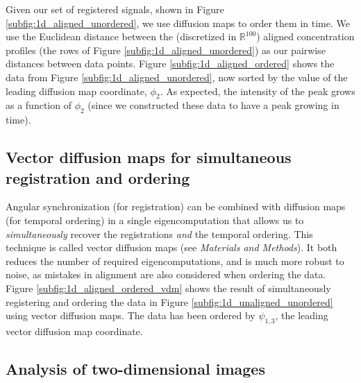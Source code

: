 \documentclass{pnastwo}
\begin{document}
\begin{article}
Given our set of registered signals, shown in Figure \ref{subfig:1d_aligned_unordered}, we use diffusion maps to order them in time.
%
We use the Euclidean distance between the (discretized in $\mathbb{R}^{100}$) aligned concentration profiles (the rows of Figure \ref{subfig:1d_aligned_unordered}) as our pairwise distances between data points.
%
Figure \ref{subfig:1d_aligned_ordered} shows the data from Figure \ref{subfig:1d_aligned_unordered}, now sorted by the value of the leading diffusion map coordinate, $\phi_2$.
%
As expected, the intensity of the peak grows as a function of $\phi_2$ (since we constructed these data
to have a peak growing in time).
%
%

\subsection{Vector diffusion maps for simultaneous registration and ordering}

%
%
Angular synchronization (for registration) can be combined with diffusion maps (for temporal ordering) in a single eigencomputation that allows us to {\em simultaneously} recover the registrations {\em and} the temporal ordering.
%
This technique is called vector diffusion maps \cite{singer2012vector} (see {\it Materials and Methods}).
%
It both reduces the number of required eigencomputations, and is much more robust to noise, as mistakes in alignment are also considered when ordering the data.
%
Figure \ref{subfig:1d_aligned_ordered_vdm} shows the result of simultaneously registering and ordering the data in Figure \ref{subfig:1d_unaligned_unordered} using vector diffusion maps.
%
The data has been ordered by $\psi_{1, 3}$, the leading vector diffusion map coordinate.

\subsection{Analysis of two-dimensional images}


\end{article}
\end{document}
